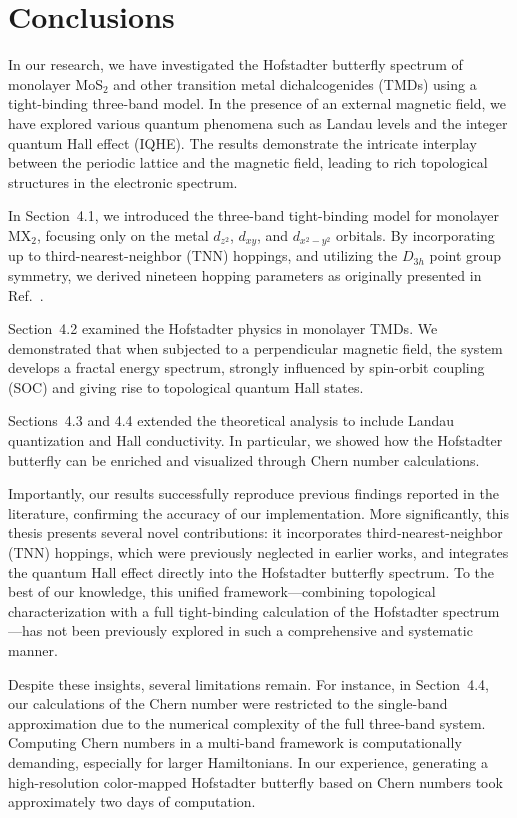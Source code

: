\section{Conclusions}


In our research, we have investigated the Hofstadter butterfly spectrum of monolayer MoS$_{2}$ and other transition metal dichalcogenides (TMDs) using a tight-binding three-band model. In the presence of an external magnetic field, we have explored various quantum phenomena such as Landau levels and the integer quantum Hall effect (IQHE). The results demonstrate the intricate interplay between the periodic lattice and the magnetic field, leading to rich topological structures in the electronic spectrum.

In Section~4.1, we introduced the three-band tight-binding model for monolayer MX$_2$, focusing only on the metal $d_{z^2}$, $d_{xy}$, and $d_{x^2 - y^2}$ orbitals. By incorporating up to third-nearest-neighbor (TNN) hoppings, and utilizing the $D_{3h}$ point group symmetry, we derived nineteen hopping parameters as originally presented in Ref.~\cite{PhysRevB.88.085433}.

Section~4.2 examined the Hofstadter physics in monolayer TMDs. We demonstrated that when subjected to a perpendicular magnetic field, the system develops a fractal energy spectrum, strongly influenced by spin-orbit coupling (SOC) and giving rise to topological quantum Hall states.

Sections~4.3 and 4.4 extended the theoretical analysis to include Landau quantization and Hall conductivity. In particular, we showed how the Hofstadter butterfly can be enriched and visualized through Chern number calculations.

Importantly, our results successfully reproduce previous findings reported in the literature, confirming the accuracy of our implementation. More significantly, this thesis presents several novel contributions: it incorporates third-nearest-neighbor (TNN) hoppings, which were previously neglected in earlier works, and integrates the quantum Hall effect directly into the Hofstadter butterfly spectrum. To the best of our knowledge, this unified framework—combining topological characterization with a full tight-binding calculation of the Hofstadter spectrum—has not been previously explored in such a comprehensive and systematic manner.

Despite these insights, several limitations remain. For instance, in Section~4.4, our calculations of the Chern number were restricted to the single-band approximation due to the numerical complexity of the full three-band system. Computing Chern numbers in a multi-band framework is computationally demanding, especially for larger Hamiltonians. In our experience, generating a high-resolution color-mapped Hofstadter butterfly based on Chern numbers took approximately two days of computation.

